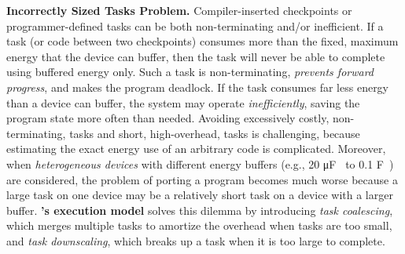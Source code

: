 \textbf{Incorrectly Sized Tasks Problem.} Compiler-inserted checkpoints or programmer-defined tasks can be both non-terminating and/or inefficient.  If a task (or code between two checkpoints) consumes more than the fixed, maximum energy that the device can buffer, then the task will never be able to complete using buffered energy only.  Such a task is non-terminating, {\em prevents forward progress}, and makes the program deadlock. If the task consumes far less energy than a device can buffer, the system may operate {\em inefficiently}, saving the program state more often than needed. Avoiding excessively costly, non-terminating, tasks and short, high-overhead, tasks is challenging, because estimating the exact energy use of an arbitrary code is complicated. Moreover, when \emph{heterogeneous devices} with different energy buffers (e.g., 20 \si{\micro\farad}~\cite{rodriguez_tbcs_2015} to 0.1 \si{\farad}~\cite{moo}) are considered, the problem of porting a program becomes much worse because a large task on one device may be a relatively short task on a device with a larger buffer. \textbf{\sys's execution model} solves this dilemma by introducing {\em task coalescing}, which merges multiple tasks to amortize the overhead when tasks are too small, and {\em task downscaling}, which breaks up a task when it is too large to complete. 
